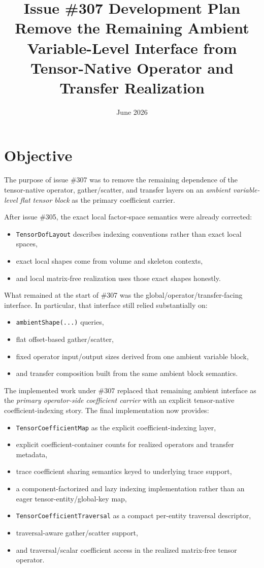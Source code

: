 \documentclass[11pt]{article}
\title{Issue \#307 Development Plan\\
Remove the Remaining Ambient Variable-Level Interface from Tensor-Native Operator and Transfer Realization}
\author{}
\date{June 2026}
\begin{document}
\maketitle

\section{Objective}

The purpose of issue \#307 was to remove the remaining dependence of the tensor-native operator, gather/scatter, and transfer layers on an \emph{ambient variable-level flat tensor block} as the primary coefficient carrier.

After issue \#305, the exact local factor-space semantics were already corrected:
\begin{itemize}[leftmargin=2em]
\item \texttt{TensorDofLayout} describes indexing conventions rather than exact local spaces,
\item exact local shapes come from volume and skeleton contexts,
\item and local matrix-free realization uses those exact shapes honestly.
\end{itemize}

What remained at the start of \#307 was the global/operator/transfer-facing interface.  In particular, that interface still relied substantially on:
\begin{itemize}[leftmargin=2em]
\item \texttt{ambientShape(...)} queries,
\item flat offset-based gather/scatter,
\item fixed operator input/output sizes derived from one ambient variable block,
\item and transfer composition built from the same ambient block semantics.
\end{itemize}

The implemented work under \#307 replaced that remaining ambient interface as the \emph{primary operator-side coefficient carrier} with an explicit tensor-native coefficient-indexing story.  The final implementation now provides:
\begin{itemize}[leftmargin=2em]
\item \texttt{TensorCoefficientMap} as the explicit coefficient-indexing layer,
\item explicit coefficient-container counts for realized operators and transfer metadata,
\item trace coefficient sharing semantics keyed to underlying trace support,
\item a component-factorized and lazy indexing implementation rather than an eager tensor-entity/global-key map,
\item \texttt{TensorCoefficientTraversal} as a compact per-entity traversal descriptor,
\item traversal-aware gather/scatter support,
\item and traversal/scalar coefficient access in the realized matrix-free tensor operator.
\end{itemize}
\end{document}
